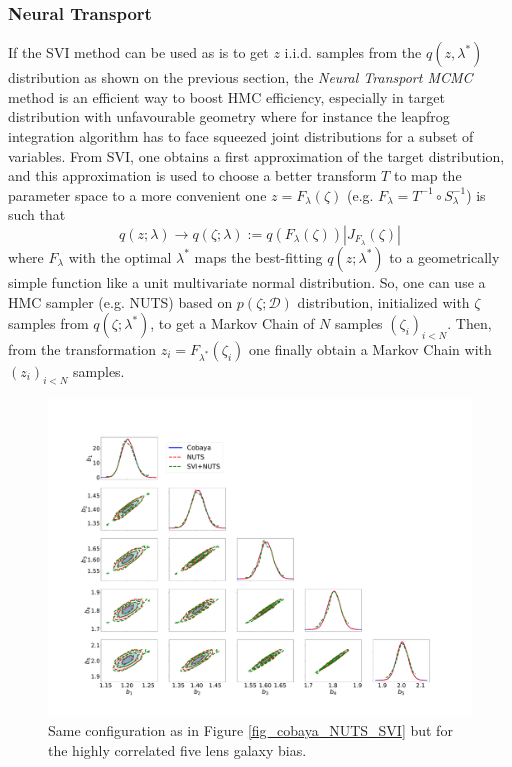 \documentclass[twocolumn,twocolappendix,nofootinbib,iop]{openjournal}
\newcommand{\nblink}[1]{\href{https://github.com/DifferentiableUniverseInitiative/jax-cosmo-paper/blob/master/notebooks/#1.ipynb}{\faFileCodeO}}
\newcommand{\bydef}{:=}
\begin{document}
\subsubsection{Neural Transport}
\label{sec-Neural-Reparametrisation}
%
If the SVI method can be used as is to get $z$ i.i.d. samples from the $q(z,\lambda^\ast)$ distribution as shown on the previous section, the \textit{Neural Transport MCMC} method \citep{Parno2018,2019arXiv190303704H} is an efficient way to boost HMC efficiency, especially in target distribution with unfavourable geometry where for instance the leapfrog integration algorithm has to face squeezed joint distributions for a subset of variables. From SVI, one obtains a first approximation of the target distribution, and this approximation is used to choose a better transform $T$ to map the parameter space to a more convenient one $z=F_\lambda(\zeta)$ (e.g. $F_\lambda=T^{-1}\circ S^{-1}_\lambda$) is such that
\begin{equation}
q(z;\lambda) \rightarrow q(\zeta;\lambda) \bydef q(F_\lambda(\zeta)) |J_{F_\lambda}(\zeta)|
\end{equation}
where $F_\lambda$ with the optimal $\lambda^\ast$ maps the best-fitting $q(z;\lambda^\ast)$ to a geometrically simple function like a unit multivariate normal distribution.  So, one can use a HMC sampler (e.g. NUTS) based on $p(\zeta;\mathcal{D})$ distribution, initialized with $\zeta$ samples from $q(\zeta;\lambda^\ast)$, to get a Markov Chain of $N$ samples $(\zeta_i)_{i<N}$. Then, from the transformation  $z_i=F_{\lambda^\ast}(\zeta_i)$ one finally obtain a Markov Chain with $(z_i)_{i<N}$ samples. %
\begin{figure}
\centering
\includegraphics[width=1.5\columnwidth]{figures/fig_Cobaya-NUTS-SVI200_bis_v1.pdf}
\caption{Same configuration as in Figure \ref{fig_cobaya_NUTS_SVI} but for the highly correlated five lens galaxy bias.}
\label{fig_cobaya_NUTS_SVI_bis}
\end{figure}
\end{document}
